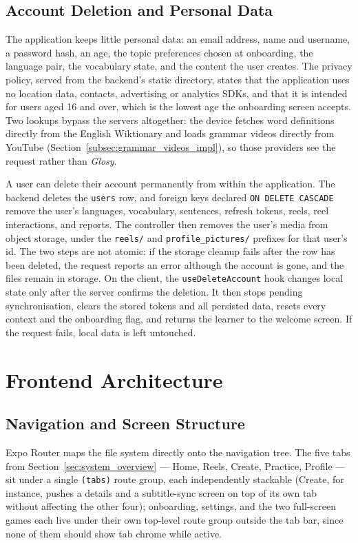     \subsection{Account Deletion and Personal Data}
    \label{subsec:account_deletion_impl}
    \begin{sloppypar}
    The application keeps little personal data: an email address, name and username, a password hash, an age, the topic preferences chosen at onboarding, the language pair, the vocabulary state, and the content the user creates. The privacy policy, served from the backend's static directory, states that the application uses no location data, contacts, advertising or analytics SDKs, and that it is intended for users aged 16 and over, which is the lowest age the onboarding screen accepts. Two lookups bypass the servers altogether: the device fetches word definitions directly from the English Wiktionary and loads grammar videos directly from YouTube (Section~\ref{subsec:grammar_videos_impl}), so those providers see the request rather than \textit{Glosy}.
    \end{sloppypar}

    A user can delete their account permanently from within the application. The backend deletes the \texttt{users} row, and foreign keys declared \texttt{ON DELETE CASCADE} remove the user's languages, vocabulary, sentences, refresh tokens, reels, reel interactions, and reports. The controller then removes the user's media from object storage, under the \texttt{reels/} and \texttt{profile\_pictures/} prefixes for that user's id. The two steps are not atomic: if the storage cleanup fails after the row has been deleted, the request reports an error although the account is gone, and the files remain in storage. On the client, the \texttt{useDeleteAccount} hook changes local state only after the server confirms the deletion. It then stops pending synchronisation, clears the stored tokens and all persisted data, resets every context and the onboarding flag, and returns the learner to the welcome screen. If the request fails, local data is left untouched.


\section{Frontend Architecture}
\label{sec:frontend_arch}
    \subsection{Navigation and Screen Structure}
    \label{subsec:navigation_impl}
    Expo Router maps the file system directly onto the navigation tree. The five tabs from Section~\ref{sec:system_overview} --- Home, Reels, Create, Practice, Profile --- sit under a single \texttt{(tabs)} route group, each independently stackable (Create, for instance, pushes a details and a subtitle-sync screen on top of its own tab without affecting the other four); onboarding, settings, and the two full-screen games each live under their own top-level route group outside the tab bar, since none of them should show tab chrome while active.

